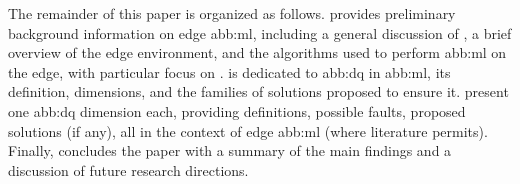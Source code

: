 
The remainder of this paper is organized as follows.
 provides preliminary background information on edge \gls{abb:ml}, including a general discussion of , a brief overview of the edge environment, and the algorithms used to perform \gls{abb:ml} on the edge, with particular focus on .
 is dedicated to \gls{abb:dq} in \gls{abb:ml}, its definition, dimensions, and the families of solutions proposed to ensure it.
 present one \gls{abb:dq} dimension each, providing definitions, possible faults, proposed solutions (if any), all in the context of edge \gls{abb:ml} (where literature permits).
Finally,  concludes the paper with a summary of the main findings and a discussion of future research directions.
